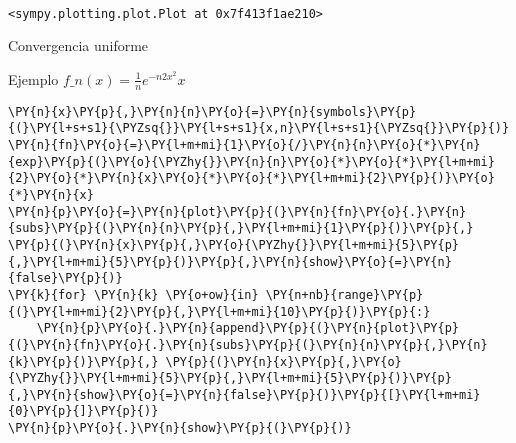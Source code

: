     \begin{center}
    \end{center}
    { \hspace*{\fill} \\}
    
            \begin{tcolorbox}[breakable, boxrule=.5pt, size=fbox, pad at break*=1mm, opacityfill=0]
\begin{Verbatim}[commandchars=\\\{\}]
<sympy.plotting.plot.Plot at 0x7f413f1ae210>
\end{Verbatim}
\end{tcolorbox}
        
    Convergencia uniforme

Ejemplo $ f\_n(x)=\frac{1}{n}e^{-n2x^2}x $

    \begin{tcolorbox}[breakable, size=fbox, boxrule=1pt, pad at break*=1mm,colback=cellbackground, colframe=cellborder]
\begin{Verbatim}[commandchars=\\\{\}]
\PY{n}{x}\PY{p}{,}\PY{n}{n}\PY{o}{=}\PY{n}{symbols}\PY{p}{(}\PY{l+s+s1}{\PYZsq{}}\PY{l+s+s1}{x,n}\PY{l+s+s1}{\PYZsq{}}\PY{p}{)}
\PY{n}{fn}\PY{o}{=}\PY{l+m+mi}{1}\PY{o}{/}\PY{n}{n}\PY{o}{*}\PY{n}{exp}\PY{p}{(}\PY{o}{\PYZhy{}}\PY{n}{n}\PY{o}{*}\PY{o}{*}\PY{l+m+mi}{2}\PY{o}{*}\PY{n}{x}\PY{o}{*}\PY{o}{*}\PY{l+m+mi}{2}\PY{p}{)}\PY{o}{*}\PY{n}{x}
\PY{n}{p}\PY{o}{=}\PY{n}{plot}\PY{p}{(}\PY{n}{fn}\PY{o}{.}\PY{n}{subs}\PY{p}{(}\PY{n}{n}\PY{p}{,}\PY{l+m+mi}{1}\PY{p}{)}\PY{p}{,} \PY{p}{(}\PY{n}{x}\PY{p}{,}\PY{o}{\PYZhy{}}\PY{l+m+mi}{5}\PY{p}{,}\PY{l+m+mi}{5}\PY{p}{)}\PY{p}{,}\PY{n}{show}\PY{o}{=}\PY{n}{false}\PY{p}{)}
\PY{k}{for} \PY{n}{k} \PY{o+ow}{in} \PY{n+nb}{range}\PY{p}{(}\PY{l+m+mi}{2}\PY{p}{,}\PY{l+m+mi}{10}\PY{p}{)}\PY{p}{:}
    \PY{n}{p}\PY{o}{.}\PY{n}{append}\PY{p}{(}\PY{n}{plot}\PY{p}{(}\PY{n}{fn}\PY{o}{.}\PY{n}{subs}\PY{p}{(}\PY{n}{n}\PY{p}{,}\PY{n}{k}\PY{p}{)}\PY{p}{,} \PY{p}{(}\PY{n}{x}\PY{p}{,}\PY{o}{\PYZhy{}}\PY{l+m+mi}{5}\PY{p}{,}\PY{l+m+mi}{5}\PY{p}{)}\PY{p}{,}\PY{n}{show}\PY{o}{=}\PY{n}{false}\PY{p}{)}\PY{p}{[}\PY{l+m+mi}{0}\PY{p}{]}\PY{p}{)}
\PY{n}{p}\PY{o}{.}\PY{n}{show}\PY{p}{(}\PY{p}{)}
\end{Verbatim}
\end{tcolorbox}

